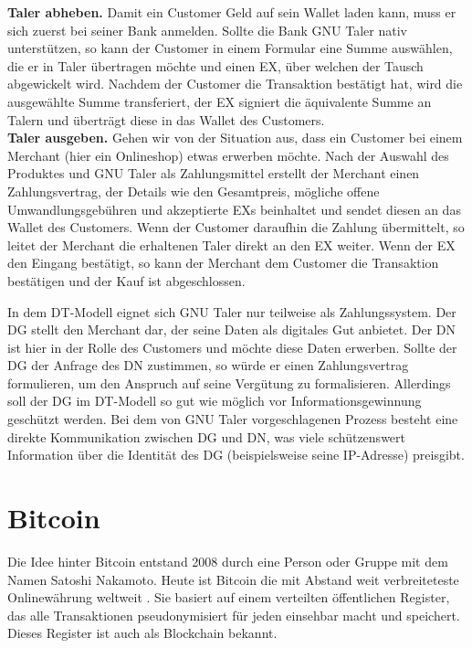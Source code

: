 \documentclass[
	fontsize=11pt,
	headings=small,
	parskip=half,           %
	bibliography=totoc,
	numbers=noenddot,       %
	open=any,               %
]{scrreprt}
\begin{document}
\textbf{Taler abheben.} Damit ein Customer Geld auf sein Wallet laden kann, muss er sich zuerst bei seiner Bank anmelden. Sollte die Bank GNU Taler nativ unterstützen, so kann der Customer in einem Formular eine Summe auswählen, die er in Taler übertragen möchte und einen EX, über welchen der Tausch abgewickelt wird. Nachdem der Customer die Transaktion bestätigt hat, wird die ausgewählte Summe transferiert, der EX signiert die äquivalente Summe an Talern und überträgt diese in das Wallet des Customers.\\

\textbf{Taler ausgeben.} Gehen wir von der Situation aus, dass ein Customer bei einem Merchant (hier ein Onlineshop) etwas erwerben möchte. Nach der Auswahl des Produktes und GNU Taler als Zahlungsmittel erstellt der Merchant einen Zahlungsvertrag, der Details wie den Gesamtpreis, mögliche offene Umwandlungsgebühren und akzeptierte EXs beinhaltet und sendet diesen an das Wallet des Customers.  Wenn der Customer daraufhin die Zahlung übermittelt, so leitet der Merchant die erhaltenen Taler direkt an den EX weiter. Wenn der EX den Eingang bestätigt, so kann der Merchant dem Customer die Transaktion bestätigen und der Kauf ist abgeschlossen.

In dem DT-Modell eignet sich GNU Taler nur teilweise als Zahlungssystem. Der DG stellt den Merchant dar, der seine Daten als digitales Gut anbietet. Der DN ist hier in der Rolle des Customers und möchte diese Daten erwerben. Sollte der DG der Anfrage des DN zustimmen, so würde er einen Zahlungsvertrag formulieren, um den Anspruch auf seine Vergütung zu formalisieren. Allerdings soll der DG im DT-Modell so gut wie möglich vor Informationsgewinnung geschützt werden. Bei dem von GNU Taler vorgeschlagenen Prozess  besteht eine direkte Kommunikation zwischen DG und DN, was viele schützenswert Information über die Identität des DG (beispielsweise seine IP-Adresse) preisgibt.

\section{Bitcoin}
\label{sec:bitcoin}
Die Idee hinter Bitcoin entstand 2008 durch eine Person oder Gruppe mit dem Namen Satoshi Nakamoto. Heute ist Bitcoin die mit Abstand weit verbreiteteste Onlinewährung weltweit \cite{btc-beginnerGuide}. Sie basiert auf einem verteilten öffentlichen Register, das alle Transaktionen pseudonymisiert für jeden einsehbar macht und speichert. Dieses Register ist auch als Blockchain bekannt.
\end{document}
